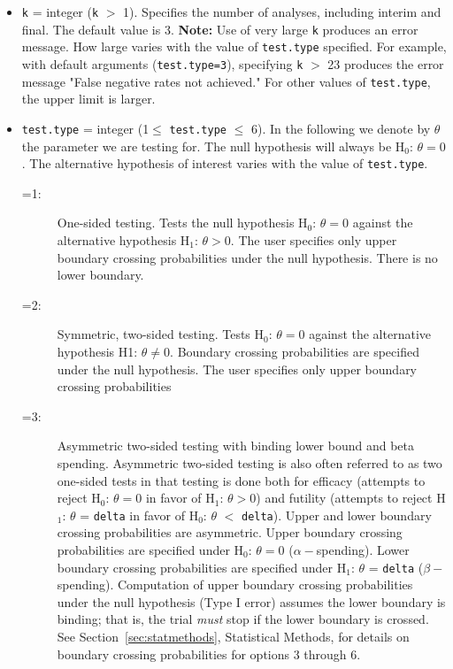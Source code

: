 \begin{itemize}
\item \texttt{k} = integer (\texttt{k}%
$>$%
1). Specifies the number of analyses, including interim and final. The default
value is 3. {\bf Note:} Use of very large \texttt{k} produces an error
message. How large varies with the value of \texttt{test.type} specified. For
example, with default arguments (\texttt{test.type=3}), specifying \texttt{k}
$>$
23 produces the error message "False negative rates not achieved." For
other values of \texttt{test.type}, the upper limit is larger.

\item \texttt{test.type} = integer (1$\leq$ \texttt{test.type} $\leq$ 6). In
the following we denote by $\theta$ the parameter we are testing for. The
null hypothesis will always be H$_{0}$: $\theta=0$. The alternative hypothesis
of interest varies with the value of \texttt{test.type}.

\begin{description}
\item[=1:] One-sided testing. Tests the null hypothesis H$_{0}$: $\theta=0$
against the alternative hypothesis H$_{1}$: $\theta>0$. The user specifies only
upper boundary crossing probabilities under the null hypothesis. There is no
lower boundary.

\item[=2:] Symmetric, two-sided testing. Tests H$_{0}$: $\theta = 0$ against the
alternative hypothesis H1: $\theta \neq 0$. Boundary crossing probabilities
are specified under the null hypothesis. The user specifies only upper boundary
crossing probabilities

\item[=3:] Asymmetric two-sided testing with binding lower bound and beta
spending. Asymmetric two-sided testing is also often referred to as two
one-sided tests in that testing is done both for efficacy (attempts to reject
H$_{0}$: $\theta = 0$ in favor of H$_{1}$: $\theta > 0$) and futility 
(attempts to reject H$_{1}$: $\theta$ = \texttt{delta} in favor of H$_{0}$: $\theta$
$<$
\texttt{delta}). Upper and lower boundary crossing probabilities are
asymmetric. Upper boundary crossing probabilities are specified under H$_{0}$:
$\theta=0$ ($\alpha-$spending). Lower boundary crossing probabilities are
specified under H$_{1}$: $\theta$ = \texttt{delta} ($\beta-$spending).
Computation of upper boundary crossing probabilities under the null hypothesis
(Type I error) assumes the lower boundary is binding; that is, the trial 
{\em must} stop if the lower boundary is crossed. See Section~\ref{sec:statmethods}, Statistical Methods, for details on
boundary crossing probabilities for options 3 through 6.


\end{description}
\end{itemize}
